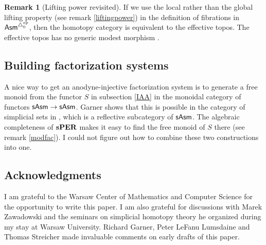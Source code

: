 \documentclass{amsart}
\theoremstyle{plain}
\theoremstyle{definition}
\newtheorem{remark}[theorem]{Remark}
\newcommand\Asm{\mathsf{Asm}}
\begin{document}
\begin{remark}[Lifting power revisited] If we use the local rather than the global lifting property (see remark \ref{liftingpower}) in the definition of fibrations in $\Asm^{\simcat_0\dual}$, then the homotopy category is equivalent to the effective topos. The effective topos has no generic modest morphism \cite{MR1023803}. %
\end{remark}

\subsection{Building factorization systems}
A nice way to get an anodyne-injective factorization system is to generate a free monoid from the functor $S$ in subsection \ref{IAA} in the monoidal category of functors $\mathsf{sAsm} \to\mathsf{sAsm}$.  Garner shows that this is possible in the category of simplicial sets in \cite{MR2899720}, which is a reflective subcategory of $\mathsf{sAsm}$. The algebraic completeness of $\mathbf{s} \mathbf{PER}$ makes it easy to find the free monoid of $S$ there (see remark \ref{modfac}). I could not figure out how to combine these two constructions into one.

\subsection*{Acknowledgments} 
I am grateful to the Warsaw Center of Mathematics and Computer Science for the opportunity to write this paper. I am also grateful for discussions with Marek Zawadowski and the seminars on simplicial homotopy theory he organized during my stay at Warsaw University. Richard Garner, Peter LeFanu Lumsdaine and Thomas Streicher made invaluable comments on early drafts of this paper.



{}
\end{document}
